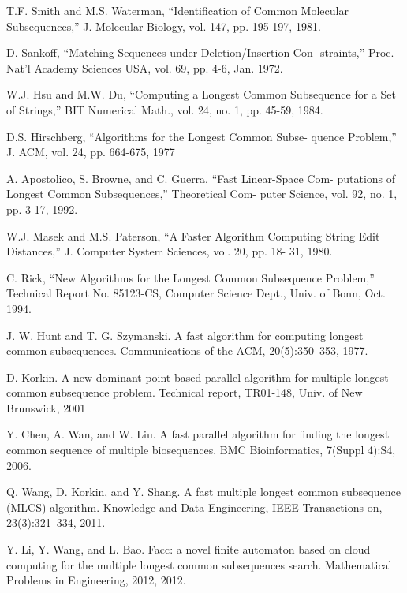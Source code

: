 \documentclass{article}
\begin{document}
\begin{thebibliography}{99}

 T.F. Smith and M.S. Waterman, “Identification of
  Common Molecular Subsequences,” J. Molecular Biology, vol. 147,
  pp. 195-197, 1981.

 D. Sankoff, “Matching Sequences under
Deletion/Insertion Con- straints,” Proc. Nat’l Academy Sciences USA,
vol. 69, pp. 4-6, Jan.  1972.

 W.J. Hsu and M.W. Du, “Computing a Longest Common
  Subsequence for a Set of Strings,” BIT Numerical Math., vol. 24,
  no. 1, pp. 45-59, 1984.

 D.S. Hirschberg, “Algorithms for the Longest Common Subse-
quence Problem,” J. ACM, vol. 24, pp. 664-675, 1977

 A. Apostolico, S. Browne, and C. Guerra,
  “Fast Linear-Space Com- putations of Longest Common Subsequences,”
  Theoretical Com- puter Science, vol. 92, no. 1, pp. 3-17, 1992.

 W.J. Masek and M.S. Paterson, “A Faster Algorithm
  Computing String Edit Distances,” J. Computer System Sciences,
  vol. 20, pp. 18- 31, 1980.

 C. Rick, “New Algorithms for the Longest Common
  Subsequence Problem,” Technical Report No. 85123-CS, Computer
  Science Dept., Univ. of Bonn, Oct. 1994.
  
 J. W. Hunt and T. G. Szymanski. A fast algorithm
  for computing longest common subsequences.  Communications of the
  ACM, 20(5):350–353, 1977.

 D. Korkin. A new dominant point-based parallel
  algorithm for multiple longest common subsequence problem. Technical
  report, TR01-148, Univ. of New Brunswick, 2001

 Y. Chen, A. Wan, and W. Liu. A fast parallel
algorithm for finding the longest common sequence of
multiple biosequences. BMC Bioinformatics, 7(Suppl
4):S4, 2006.

 Q. Wang, D. Korkin, and Y. Shang. A fast multiple
longest common subsequence (MLCS) algorithm.  Knowledge and Data
Engineering, IEEE Transactions on, 23(3):321–334, 2011.

 Y. Li, Y. Wang, and L. Bao. Facc: a novel finite
  automaton based on cloud computing for the multiple longest common
  subsequences search. Mathematical Problems in Engineering, 2012,
  2012.


\end{thebibliography}
\end{document}
